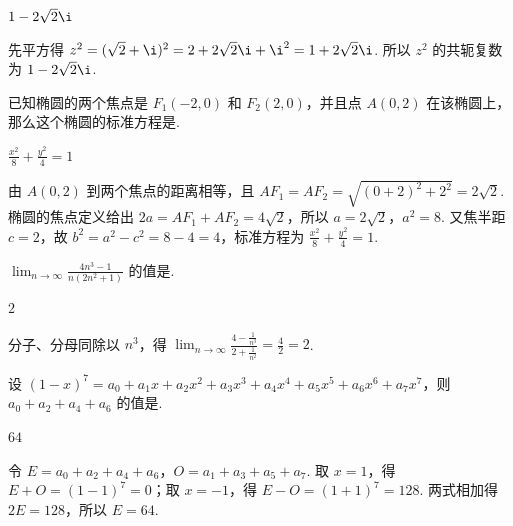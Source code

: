 \documentclass[UTF8,a4paper,oneside,11pt]{ctexbook}
\begin{document}
\begin{answer}\(1-2\sqrt2\i\)\end{answer}

\begin{solution}
先平方得 \(z^{2}=(\sqrt2+\i)^{2}=2+2\sqrt2\i+\i^{2}=1+2\sqrt2\i\). 所以 \(z^{2}\) 的共轭复数为 \(1-2\sqrt2\i\).
\end{solution}

\begin{problem}
已知椭圆的两个焦点是 \(F_{1}(-2,0)\) 和 \(F_{2}(2,0)\)，并且点 \(A(0,2)\) 在该椭圆上，那么这个椭圆的标准方程是\fillinblank{}.
\end{problem}

\begin{answer}\(\displaystyle\frac{x^{2}}8+\frac{y^{2}}4=1\)\end{answer}

\begin{solution}
由 \(A(0,2)\) 到两个焦点的距离相等，且
\(AF_{1}=AF_{2}=\sqrt{(0+2)^{2}+2^{2}}=2\sqrt2\). 椭圆的焦点定义给出 \(2a=AF_{1}+AF_{2}=4\sqrt2\)，所以 \(a=2\sqrt2\)，\(a^{2}=8\). 又焦半距 \(c=2\)，故 \(b^{2}=a^{2}-c^{2}=8-4=4\)，标准方程为 \(\frac{x^{2}}8+\frac{y^{2}}4=1\).
\end{solution}

\begin{problem}
\(\displaystyle\lim_{n\to\infty}\frac{4n^{3}-1}{n(2n^{2}+1)}\) 的值是\fillinblank{}.
\end{problem}

\begin{answer}\(2\)\end{answer}

\begin{solution}
分子、分母同除以 \(n^{3}\)，得
\(\displaystyle\lim_{n\to\infty}\frac{4-\frac1{n^{3}}}{2+\frac1{n^{2}}}=\frac42=2\).
\end{solution}

\begin{problem}
设 \((1-x)^{7}=a_{0}+a_{1}x+a_{2}x^{2}+a_{3}x^{3}+a_{4}x^{4}+a_{5}x^{5}+a_{6}x^{6}+a_{7}x^{7}\)，则 \(a_{0}+a_{2}+a_{4}+a_{6}\) 的值是\fillinblank{}.
\end{problem}

\begin{answer}\(64\)\end{answer}

\begin{solution}
令 \(E=a_{0}+a_{2}+a_{4}+a_{6}\)，\(O=a_{1}+a_{3}+a_{5}+a_{7}\). 取 \(x=1\)，得 \(E+O=(1-1)^{7}=0\)；取 \(x=-1\)，得 \(E-O=(1+1)^{7}=128\). 两式相加得 \(2E=128\)，所以 \(E=64\).
\end{solution}
\end{document}
